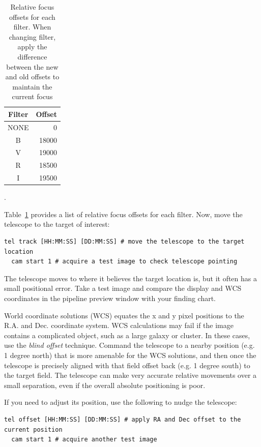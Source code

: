 \documentclass[12pt,a4paper]{article}
\begin{document}
\begin{table}[h!]
\centering
\begin{tabular}{|c r|} 
 \hline
 Filter & Offset\\[0.5ex] 
 \hline\hline
 NONE & 0\\
 B & 18000\\
 V & 19000\\
 R & 18500\\
 I & 19500\\
 [1ex] 
 \hline
\end{tabular}

\caption{Relative focus offsets for each filter. When changing filter, apply the difference between the new and old offsets to maintain the current focus}.
\label{table:filter-focus-offsets}
\end{table}

Table~\ref{table:filter-focus-offsets} provides a list of relative focus offsets for each filter. Now, move the telescope to the target of interest:
\\
\begin{lstlisting}[language=commands]
  tel track [HH:MM:SS] [DD:MM:SS] # move the telescope to the target location
  cam start 1 # acquire a test image to check telescope pointing
\end{lstlisting}

The telescope moves to where it believes the target location is, but it often has a small positional error. Take a test image and compare the display and WCS coordinates in the pipeline preview window with your finding chart. 

World coordinate solutions (WCS) equates the x and y pixel positions to the R.A. and Dec. coordinate system.  WCS calculations may fail if the image contains a complicated object, such as a large galaxy or cluster. In these cases, use the \emph{blind offset} technique. Command the telescope to a nearby position (e.g. 1 degree north) that is more amenable for the WCS solutions, and then once the telescope is precisely aligned with that field offset back (e.g. 1 degree south) to the target field. The telescope can make very accurate relative movements over a small separation, even if the overall absolute positioning is poor.

If you need to adjust its position, use the following to nudge the telescope:
\\
\begin{lstlisting}[language=commands]
  tel offset [HH:MM:SS] [DD:MM:SS] # apply RA and Dec offset to the current position
  cam start 1 # acquire another test image 
\end{lstlisting}
\end{document}
